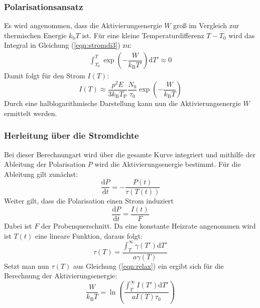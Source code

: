 \subsubsection{Polarisationsansatz}
\label{sec:polaris}
Es wird angenommen, dass die Aktivierungsenergie $W$ groß im Vergleich zur thermischen Energie $k_\mathrm{b} T$ ist. Für eine kleine Temperaturdifferenz $T-T_\mathrm{0}$ wird das Integral in Gleichung (\ref{eqn:stromdi3}) zu:
\begin{align*}
  \int_{T_0}^T\exp{\left(-\dfrac{W}{k_\mathrm{B}T'}\right)\mathrm{d}T'}\approx0
\end{align*}
Damit folgt für den Strom $I(T)$:
\begin{equation}
  \label{eqn:polarime}
  I(T)\approx \dfrac{p^2 E}{3k_\mathrm{B}T_\mathrm{P}}\dfrac{N_\mathrm{0}}{\tau_\mathrm{0}}\exp\left(-\dfrac{W}{k_\mathrm{B}T}\right)
\end{equation}
Durch eine halblogarithmische Darstellung kann nun die Aktivierungsenergie $W$ ermittelt werden.
\subsubsection{Herleitung über die Stromdichte}
\label{sec:strom1}
Bei dieser Berechnungart wird über die gesamte Kurve integriert und mithilfe der Ableitung der Polarisation $P$ wird die Aktivierungsenergie bestimmt. Für die Ableitung gilt zunächst:
\begin{equation*}
  \dfrac{\mathrm{d}P}{\mathrm{d}t}=-\dfrac{P(t)}{\tau(T(t))}
\end{equation*}
Weiter gilt, dass die Polarisation einen Strom induziert
\begin{equation*}
  \dfrac{\mathrm{d}P}{\mathrm{d}t}=\dfrac{I(t)}{F}
\end{equation*}
Dabei ist $F$ der Probenquerschnitt. Da eine konstante Heizrate angenommen wird ist $T(t)$ eine lineare Funktion, daraus folgt:
\begin{equation*}
  \tau(T) = \frac{\int_{T}^\infty \gamma(T') \mathrm{d}T' }{ a \gamma(T) }
\end{equation*}
Setzt man nun $\tau(T)$ aus Gleichung (\ref{eqn:relax}) ein ergibt sich für die Berechnung der Aktivierungsenergie:
\begin{equation}
  \label{eqn:integrate}
  \dfrac{ W }{ k_\mathrm{B} T } = \ln{ \left( \frac{ \int_{T}^\infty I(T') \mathrm{d}T' }{ a I(T) \tau_\mathrm{0} } \right) }
\end{equation}
